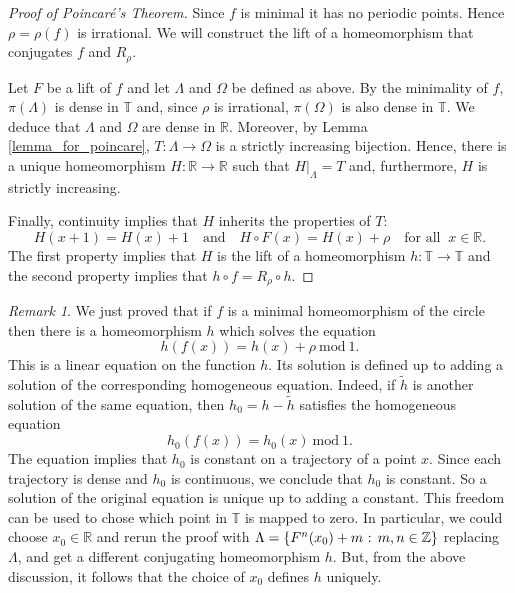 \documentclass[12pt]{article}
\theoremstyle{definition}
\theoremstyle{remark}
\newtheorem{remark}[theorem]{Remark}
\begin{document}
\smallskip

\begin{proof}[Proof of Poincar\'e's Theorem]
Since $f$ is minimal it has no periodic points. Hence $\rho = \rho(f)$ is irrational.
We will construct the lift of a homeomorphism that conjugates $f$ and $R_\rho$.

Let $F$ be a lift of $f$ and let $\Lambda$ and $\Omega$ be defined as above.
By the minimality of $f$, $\pi(\Lambda)$ is dense in $\mathbb T$ and, since $\rho$ is irrational,
$\pi(\Omega)$ is also dense in $\mathbb T$. We deduce that $\Lambda$ and $\Omega$ are dense in $\mathbb R$.
Moreover, by Lemma \ref{lemma_for_poincare}, $T : \Lambda \to \Omega$ is a strictly increasing
bijection.
Hence, there is a unique homeomorphism $H : \mathbb R \to \mathbb R$ such that $H|_\Lambda =T$
and, furthermore, $H$ is strictly increasing.

Finally, continuity implies that $H$ inherits the properties of $T$:
\[
H(x+1) = H(x)+1 \quad \text{and} \quad 
H \circ F(x) = H(x) + \rho
\quad \text{for all } \ x \in \mathbb R.
\]
The first property implies that $H$ is the lift of a homeomorphism $h : \mathbb T\to \mathbb T$ and the second property implies that $h \circ f = R_\rho \circ h$.
\end{proof}


\begin{remark}
We just proved that if $f$ is a minimal homeomorphism of the circle then there
is a homeomorphism $h$ which solves the equation
\[
h(f(x)) = h(x) + \rho \ \text{mod} \ 1.
\]
This is a linear equation on the function $h$. Its solution is defined up to
adding a solution of the corresponding homogeneous equation. Indeed, if
$\tilde h$
is another solution of the same equation, then $h_0 = h - \tilde h$ satisfies the
homogeneous equation
\[
h_0(f(x)) = h_0(x) \ \text{mod} \ 1.
\]
The equation implies that $h_0$ is constant on a trajectory of a point $x$. Since each
trajectory is dense and $h_0$ is continuous, we conclude that $h_0$ is constant.
So a solution of the original equation is unique up to adding a constant.
This freedom can be used to chose which point in $\mathbb T$ is mapped to zero.
In particular, we could choose $x_0 \in \mathbb R$ and rerun the proof with 
$\Lambda= \{F^n(x_0) +m \hbox{ : } m,n \in \mathbb Z\}$ replacing $\Lambda$, and get a different 
conjugating homeomorphism $h$. But, from the above discussion,
it follows that the choice of $x_0$ defines $h$ uniquely.
\end{remark}
\end{document}
